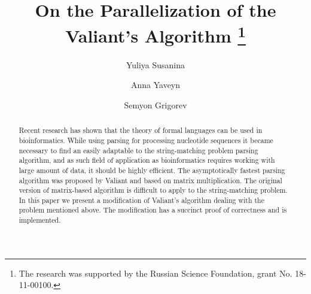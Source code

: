 \documentclass[runningheads]{llncs}
\begin{document}
%
\title{On the Parallelization of the Valiant's Algorithm \thanks{The research was supported by the Russian Science Foundation, grant No. 18-11-00100.}}
%
%
\author{Yuliya Susanina \and
Anna Yaveyn \and
Semyon Grigorev}
%
%
%
\maketitle              %
%
\begin{abstract}
Recent  research  has  shown  that the theory of formal languages can be used in bioinformatics. While using parsing for processing nucleotide sequences it became necessary to find an easily adaptable to the string-matching problem parsing algorithm, and as such field of application as bioinformatics requires working with large amount of data, it should be highly efficient. The asymptotically fastest parsing algorithm was proposed by Valiant and based on matrix multiplication. The original version of matrix-based algorithm is difficult to apply to the string-matching problem. In this paper we present  a modification  of Valiant's  algorithm dealing with the problem mentioned above. The modification has a succinct proof of correctness and is implemented.

\end{abstract}
%
%
%





\end{document}
